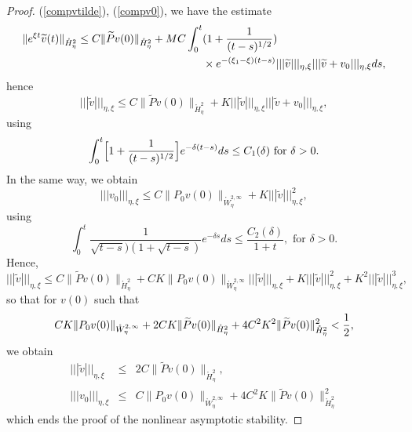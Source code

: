 \documentclass[11pt]{article}
\begin{document}
\begin{proof}
(\ref{compvtilde}), (\ref{compv0}), we have the estimate%
\begin{align*}
\|e^{\xi  t}\widetilde{v}(t)\|_{\mathring{H}_{\eta}^{2}}
\leq C\|\widetilde{P}%
v(0)\|_{\mathring{H}_{\eta}^{2}}+MC\int_{0}^{t} &(1+\frac{1}{(t-s)^{1/2}}%
)
\\ 
& \times e^{-(\xi _{1}-\xi  )(t-s)}|||\widetilde{v}|||_{\eta,\xi  }|||\widetilde{%
v}+v_{0}|||_{\eta,\xi } ds,
\end{align*}%
hence%
\begin{equation*}
|||\widetilde{v}|||_{\eta,\xi }\leq C\|\widetilde{P}v(0)\|_{\mathring{H}%
_{\eta}^{2}}+K|||\widetilde{v}|||_{\eta,\xi }|||\widetilde{v}%
+v_{0}|||_{\eta,\xi  },
\end{equation*}%
using%
\begin{equation*}
\int_{0}^{t} \Bigl[ 1+\frac{1}{(t-s)^{1/2}} \Bigr] e^{-\delta (t-s)}ds\leq C_{1}(\delta )%
\text{ for }\delta >0.
\end{equation*}%
In the same way, we obtain%
\begin{equation*}
|||v_{0}|||_{\eta,\xi }\leq C\|P_{0}v(0)\|_{\mathring{W}_{\eta}^{2,\infty
}}+K|||\widetilde{v}|||_{\eta,\xi }^{2},
\end{equation*}%
using%
\begin{equation*}
\int_{0}^{t}\frac{1}{\sqrt{t-s}) (1+\sqrt{t-s})}e^{-\delta s}ds\leq \frac{C_{2}(\delta )}{1+t},\text{ for }\delta >0.
\end{equation*}%
Hence, 
\begin{equation*}
|||\widetilde{v}|||_{\eta,\xi }\leq C\|\widetilde{P}v(0)\|_{\mathring{H}%
_{\eta}^{2}}+CK\|P_{0}v(0)\|_{\mathring{W}_{\eta}^{2,\infty }}|||\widetilde{v}%
|||_{\eta,\xi }+K|||\widetilde{v}|||_{\eta,\xi }^{2}+K^{2}|||\widetilde{v}%
|||_{\eta,\xi }^{3},
\end{equation*}%
so that for $v(0)$ such that%
\begin{equation*}
CK\|P_{0}v(0)\|_{\mathring{W}_{\eta}^{2,\infty }}+2CK\|\widetilde{P}v(0)\|_{%
\mathring{H}_{\eta}^{2}}+4C^{2}K^{2}\|\widetilde{P}v(0)\|_{\mathring{H}%
_{\eta}^{2}}^{2}< \frac{1}{2},
\end{equation*}%
we obtain%
\begin{eqnarray*}
|||\widetilde{v}|||_{\eta,\xi } &\leq &2C\|\widetilde{P}v(0)\|_{\mathring{H}%
_{\eta}^{2}}, \\
|||v_{0}|||_{\eta,\xi } &\leq &C\|P_{0}v(0)\|_{\mathring{W}_{\eta}^{2,\infty
}}+4C^{2}K\|\widetilde{P}v(0)\|_{\mathring{H}_{\eta}^{2}}^{2}
\end{eqnarray*}%
which ends the proof of the nonlinear asymptotic stability.
\end{proof}
\end{document}
